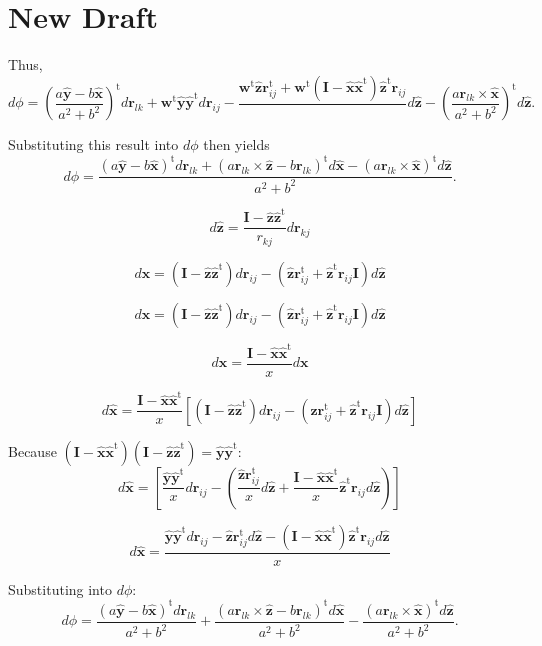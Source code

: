 \documentclass[11pt]{article}
\newcommand{\mt}[1]{\boldsymbol{\mathbf{#1}}}           %
\newcommand{\vt}[1]{\boldsymbol{\mathbf{#1}}}           %
\newcommand{\tr}[1]{#1^\text{t}}                        %
\begin{document}
\section{New Draft}

Thus,
\[
d\phi = \tr{\left(\frac{a\hat{\vt y} - b\hat{\vt x}}{a^2 + b^2}\right)}d{\vt r}_{lk}
+ \tr{\vt w} \hat{\vt y}\tr{\hat{\vt y}}d{\vt r}_{ij} - \frac{\tr{\vt w}\hat{\vt z}\tr{{\vt r}_{ij}} + \tr{\vt w}(\mt I - \hat{\vt x}\tr{\hat{\vt x}})\tr{\hat{\vt z}} {\vt r}_{ij}}{}d\hat{\vt z}
- \tr{\left(\frac{a{\vt r}_{lk} \times \hat{\vt x}}{a^2 + b^2}\right)}d\hat{\vt z}.
\]


Substituting this result into $d\phi$ then yields
\[
d\phi = \frac{\tr{(a\hat{\vt y}-b\hat{\vt x})}d{\vt r}_{lk} + \tr{(a{\vt r}_{lk} \times \hat{\vt z} - b{\vt r}_{lk})}d\hat{\vt x} - \tr{(a{\vt r}_{lk} \times \hat{\vt x})}d\hat{\vt z}}{a^2 + b^2}.
\]


\[
d\hat{\vt z} = \frac{\mt I - \hat{\vt z}\tr{\hat{\vt z}}}{r_{kj}} d{\vt r}_{kj}
\]

\[
d\vt x = (\mt I - \hat{\vt z}\tr{\hat{\vt z}})d{\vt r}_{ij} - (\hat{\vt z}\tr{{\vt r}_{ij}} + \tr{\hat{\vt z}} {\vt r}_{ij} \mt I) d\hat{\vt z}
\]


\[
d\vt x = (\mt I - \hat{\vt z}\tr{\hat{\vt z}})d{\vt r}_{ij} - (\hat{\vt z}\tr{{\vt r}_{ij}} + \tr{\hat{\vt z}} {\vt r}_{ij} \mt I) d\hat{\vt z}
\]




\[
d\hat{\vt x} = \frac{\mt I - \hat{\vt x}\tr{\hat{\vt x}}}{x} d\vt x
\]


\[
d\hat{\vt x} = \frac{\mt I - \hat{\vt x}\tr{\hat{\vt x}}}{x} \left[ (\mt I - \hat{\vt z}\tr{\hat{\vt z}})d{\vt r}_{ij} - (\hat{\vt z}\tr{{\vt r}_{ij}} + \tr{\hat{\vt z}} {\vt r}_{ij} \mt I) d\hat{\vt z} \right]
\]





Because $(\mt I - \hat{\vt x}\tr{\hat{\vt x}})(\mt I - \hat{\vt z}\tr{\hat{\vt z}}) = \hat{\vt y}\tr{\hat{\vt y}}$:
\[
d\hat{\vt x} =  \left[ \frac{\hat{\vt y}\tr{\hat{\vt y}}}{x}d{\vt r}_{ij} - \left( \frac{\hat{\vt z}\tr{{\vt r}_{ij}}}{x}d\hat{\vt z} + \frac{\mt I - \hat{\vt x}\tr{\hat{\vt x}}}{x}\tr{\hat{\vt z}} {\vt r}_{ij} d\hat{\vt z} \right) \right]
\]

\[
d\hat{\vt x} = \frac{\hat{\vt y}\tr{\hat{\vt y}}d{\vt r}_{ij} - \hat{\vt z}\tr{{\vt r}_{ij}}d\hat{\vt z} - (\mt I - \hat{\vt x}\tr{\hat{\vt x}})\tr{\hat{\vt z}} {\vt r}_{ij} d\hat{\vt z}    }{x}
\]

Substituting into $d\phi$:
\[
d\phi = \frac{\tr{(a\hat{\vt y}-b\hat{\vt x})}d{\vt r}_{lk}}{a^2 + b^2} + \frac{\tr{(a{\vt r}_{lk} \times \hat{\vt z} - b{\vt r}_{lk})}d\hat{\vt x}}{a^2 + b^2} - \frac{\tr{(a{\vt r}_{lk} \times \hat{\vt x})}d\hat{\vt z}}{a^2 + b^2}.
\]
\end{document}
